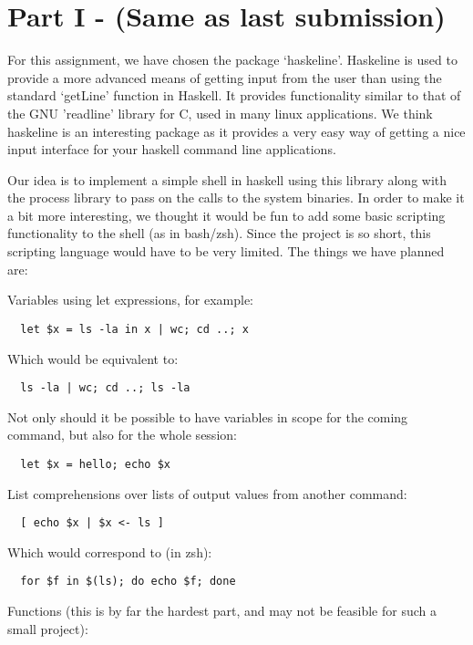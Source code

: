 \documentclass[11pt,a4paper]{article}
\begin{document}
\newpage
\appendix

\section{Part I - (Same as last submission)}
For this assignment, we have chosen the package ‘haskeline’. Haskeline is used
to provide a more advanced means of getting input from the user than using the
standard ‘getLine’ function in Haskell. It provides functionality similar to
that of the GNU 'readline' library for C, used in many linux applications. We
think haskeline is an interesting package as it provides a very easy way of
getting a nice input interface for your haskell command line applications.

Our idea is to implement a simple shell in haskell using this library along with
the process library to pass on the calls to the system binaries. In order to
make it a bit more interesting, we thought it would be fun to add some basic
scripting functionality to the shell (as in bash/zsh). Since the project is so
short, this scripting language would have to be very limited. The things we have
planned are:

Variables using let expressions, for example:
\begin{verbatim}
  let $x = ls -la in x | wc; cd ..; x
\end{verbatim}

Which would be equivalent to:

\begin{verbatim}
  ls -la | wc; cd ..; ls -la
\end{verbatim}

Not only should it be possible to have variables in scope for the coming
command, but also for the whole session:

\begin{verbatim}
  let $x = hello; echo $x
\end{verbatim}

List comprehensions over lists of output values from another command:

\begin{verbatim}
  [ echo $x | $x <- ls ]
\end{verbatim}

Which would correspond to (in zsh):

\begin{verbatim}
  for $f in $(ls); do echo $f; done
\end{verbatim}

Functions (this is by far the hardest part, and may not be feasible for such a small project):
\end{document}
